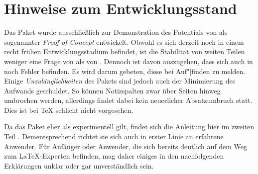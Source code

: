 \section{Hinweise zum Entwicklungsstand}

Das Paket wurde ausschließlich zur Demonstration des Potentials von
\hyperref[cha:scrlayer]{}
als sogenannter \emph{Proof of Concept}
entwickelt. Obwohl es sich derzeit noch in einem recht frühen
Entwicklungsstadium befindet, ist die Stabilität von weiten Teilen weniger
eine Frage von  als von
\hyperref[cha:scrlayer]{}. Dennoch ist davon auszugehen,
dass sich auch in  noch Fehler befinden. Es wird
darum gebeten, diese bei Auf"|finden zu melden. Einige
\emph{Unzulänglichkeiten} des Pakets sind jedoch auch der Minimierung des
Aufwands geschuldet. So können Notizspalten zwar über Seiten hinweg umbrochen
werden, allerdings findet dabei kein neuerlicher Absatzumbruch statt. Dies ist
bei \TeX{} schlicht nicht vorgesehen.

Da das Paket eher als experimentell gilt, findet sich
die Anleitung hier im zweiten Teil . Dementsprechend richtet sie sich auch in erster Linie an erfahrene
Anwender. Für Anfänger oder Anwender, die sich bereits deutlich auf dem Weg
zum \LaTeX-Experten befinden, mag daher einiges
in den nachfolgenden Erklärungen unklar oder gar unverständlich
sein. 

\iffalse%
Es sei auch darauf\textnote{Achtung!} hingewiesen, dass der \KOMAScript-Autor
nicht für die Weiterentwicklung des Pakets garantiert und nur eingeschränkten
Support dafür bietet. Das liegt in der Natur eines Pakets, das nur zu
Demonstrationszwecken geschrieben wurde.%
\fi


